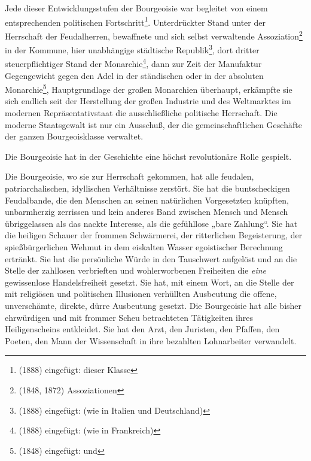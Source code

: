 \documentclass[letterpaper]{article}
\begin{document}
Jede dieser Entwicklungsstufen der Bourgeoisie war begleitet von einem entsprechenden politischen Fortschritt\footnote{(1888) eingefügt: dieser Klasse}. Unterdrückter Stand unter der Herrschaft der Feudalherren, bewaffnete und sich selbst verwaltende Assoziation\footnote{(1848, 1872) Assoziationen} in der Kommune, hier unabhängige städtische Republik\footnote{(1888) eingefügt: (wie in Italien und Deutschland)}, dort dritter steuerpflichtiger Stand der Monarchie\footnote{(1888) eingefügt: (wie in Frankreich)}, dann zur Zeit der Manufaktur Gegengewicht gegen den Adel in der ständischen oder in der absoluten Monarchie\footnote{(1848) eingefügt: und}, Hauptgrundlage der großen Monarchien überhaupt, erkämpfte sie sich endlich seit der Herstellung der großen Industrie und des Weltmarktes im modernen Repräsentativstaat die ausschließliche politische Herrschaft. Die moderne Staatsgewalt ist nur ein Ausschuß, der die gemeinschaftlichen Geschäfte der ganzen Bourgeoisklasse verwaltet.

Die Bourgeoisie hat in der Geschichte eine höchst revolutionäre Rolle gespielt.

Die Bourgeoisie, wo sie zur Herrschaft gekommen, hat alle feudalen, patriarchalischen, idyllischen Verhältnisse zerstört. Sie hat die buntscheckigen Feudalbande, die den Menschen an seinen natürlichen Vorgesetzten knüpften, unbarmherzig zerrissen und kein anderes Band zwischen Mensch und Mensch übriggelassen als das nackte Interesse, als die gefühllose „bare Zahlung“. Sie hat die heiligen Schauer der frommen Schwärmerei, der ritterlichen Begeisterung, der spießbürgerlichen Wehmut in dem eiskalten Wasser egoistischer Berechnung ertränkt. Sie hat die persönliche Würde in den Tauschwert aufgelöst und an die Stelle der zahllosen verbrieften und wohlerworbenen Freiheiten die \textit{eine} gewissenlose Handelsfreiheit gesetzt. Sie hat, mit einem Wort, an die Stelle der mit religiösen und politischen Illusionen verhüllten Ausbeutung die offene, unverschämte, direkte, dürre Ausbeutung gesetzt.
Die Bourgeoisie hat alle bisher ehrwürdigen und mit frommer Scheu betrachteten Tätigkeiten ihres Heiligenscheins entkleidet. Sie hat den Arzt, den Juristen, den Pfaffen, den Poeten, den Mann der Wissenschaft in ihre bezahlten Lohnarbeiter verwandelt.
\end{document}
